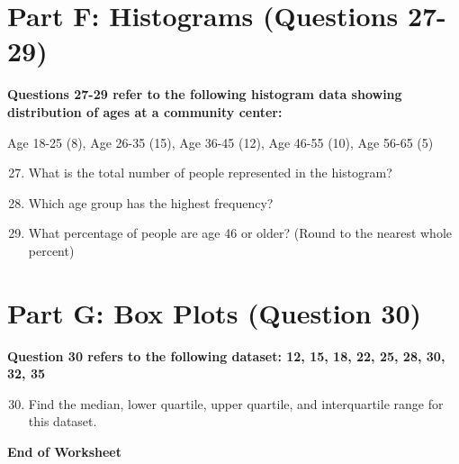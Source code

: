 \documentclass[12pt]{article}
\begin{document}
\section*{Part F: Histograms (Questions 27-29)}

\noindent\textbf{Questions 27-29 refer to the following histogram data showing distribution of ages at a community center:}

\noindent Age 18-25 (8), Age 26-35 (15), Age 36-45 (12), Age 46-55 (10), Age 56-65 (5)

\begin{enumerate}
\setcounter{enumi}{26}
\item What is the total number of people represented in the histogram?
\vspace{0.8in}

\item Which age group has the highest frequency?
\vspace{0.8in}

\item What percentage of people are age 46 or older? (Round to the nearest whole percent)
\vspace{0.8in}
\end{enumerate}

\section*{Part G: Box Plots (Question 30)}

\noindent\textbf{Question 30 refers to the following dataset: 12, 15, 18, 22, 25, 28, 30, 32, 35}

\begin{enumerate}
\setcounter{enumi}{29}
\item Find the median, lower quartile, upper quartile, and interquartile range for this dataset.
\vspace{1.5in}
\end{enumerate}

\vspace{1in}

\noindent\textbf{End of Worksheet}
\end{document}

